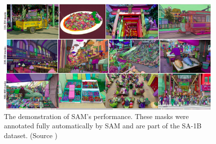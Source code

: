 \begin{figure}[h]
  \centering
  \includegraphics[width=\linewidth]{text/chapter_03/imgs/sam_example}
  \caption{The demonstration of SAM's performance. These masks were annotated fully automatically by SAM and are part of
  the SA-1B dataset. (Source \cite{SAM2023})}
  \label{fig:sam_example}
\end{figure}


